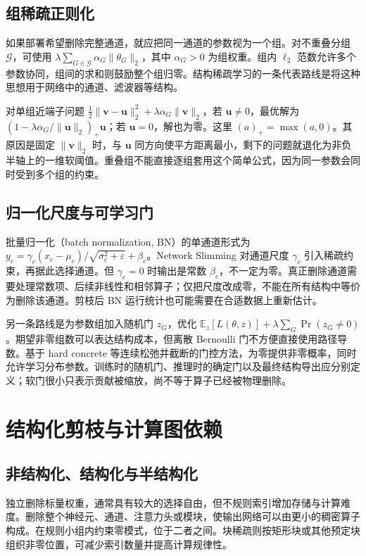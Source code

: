 \documentclass[UTF8,12pt,a4paper,fontset=fandol]{ctexart}
\begin{document}
\subsection{组稀疏正则化}
如果部署希望删除完整通道，就应把同一通道的参数视为一个组。对不重叠分组 $\mathcal G$，可使用 $\lambda\sum_{G\in\mathcal G}\alpha_G\|\theta_G\|_2$，其中 $\alpha_G>0$ 为组权重。组内 $\ell_2$ 范数允许多个参数协同，组间的求和则鼓励整个组归零。结构稀疏学习的一条代表路线是将这种思想用于网络中的通道、滤波器等结构\cite{wen2016}。

对单组近端子问题 $\tfrac12\|\mathbf v-\mathbf u\|_2^2+\lambda\alpha_G\|\mathbf v\|_2$，若 $\mathbf u\ne0$，最优解为 $(1-\lambda\alpha_G/\|\mathbf u\|_2)_+\mathbf u$；若 $\mathbf u=0$，解也为零。这里 $(a)_+=\max(a,0)$。其原因是固定 $\|\mathbf v\|_2$ 时，与 $\mathbf u$ 同方向使平方距离最小，剩下的问题就退化为非负半轴上的一维软阈值。重叠组不能直接逐组套用这个简单公式，因为同一参数会同时受到多个组的约束。

\subsection{归一化尺度与可学习门}
批量归一化（batch normalization, BN）的单通道形式为 $y_c=\gamma_c(x_c-\mu_c)/\sqrt{\sigma_c^2+\varepsilon}+\beta_c$。Network Slimming 对通道尺度 $\gamma_c$ 引入稀疏约束，再据此选择通道\cite{liu2017}。但 $\gamma_c=0$ 时输出是常数 $\beta_c$，不一定为零。真正删除通道需要处理常数项、后续非线性和相邻算子；仅把尺度改成零，不能在所有结构中等价为删除该通道。剪枝后 BN 运行统计也可能需要在合适数据上重新估计。

另一条路线是为参数组加入随机门 $z_G$，优化 $\mathbb E_z[L(\theta,z)]+\lambda\sum_G\Pr(z_G\ne0)$。期望非零组数可以表达结构成本，但离散 Bernoulli 门不方便直接使用路径导数。基于 hard concrete 等连续松弛并截断的门控方法，为零提供非零概率，同时允许学习分布参数\cite{louizos2018}。训练时的随机门、推理时的确定门以及最终结构导出应分别定义；软门很小只表示贡献被缩放，尚不等于算子已经被物理删除。

\section{结构化剪枝与计算图依赖}
\label{sec:prune-structured}

\subsection{非结构化、结构化与半结构化}
独立删除标量权重，通常具有较大的选择自由，但不规则索引增加存储与计算难度。删除整个神经元、通道、注意力头或模块，使输出网络可以由更小的稠密算子构成。在规则小组内约束零模式，位于二者之间。块稀疏则按矩形块或其他预定块组织非零位置，可减少索引数量并提高计算规律性。
\end{document}
